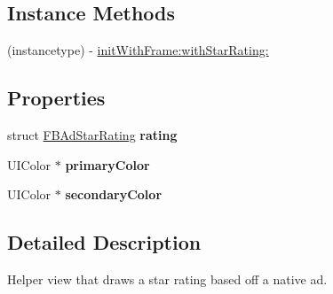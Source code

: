 \subsection*{Instance Methods}
\begin{DoxyCompactItemize}
\item 
(instancetype) -\/ \hyperlink{interface_f_b_ad_star_rating_view_a3f39ce2c6898e4ad58782983c757095e}{init\-With\-Frame\-:with\-Star\-Rating\-:}
\end{DoxyCompactItemize}
\subsection*{Properties}
\begin{DoxyCompactItemize}
\item 
\hypertarget{interface_f_b_ad_star_rating_view_ad4fe48e52d57b68092713ab2621f12e5}{struct \hyperlink{struct_f_b_ad_star_rating}{F\-B\-Ad\-Star\-Rating} {\bfseries rating}}\label{interface_f_b_ad_star_rating_view_ad4fe48e52d57b68092713ab2621f12e5}

\item 
\hypertarget{interface_f_b_ad_star_rating_view_abdccdf07181e9d4414a4bd5f04290f11}{U\-I\-Color $\ast$ {\bfseries primary\-Color}}\label{interface_f_b_ad_star_rating_view_abdccdf07181e9d4414a4bd5f04290f11}

\item 
\hypertarget{interface_f_b_ad_star_rating_view_aa4928b3e9d89a8e013c1a921fc300128}{U\-I\-Color $\ast$ {\bfseries secondary\-Color}}\label{interface_f_b_ad_star_rating_view_aa4928b3e9d89a8e013c1a921fc300128}

\end{DoxyCompactItemize}


\subsection{Detailed Description}
Helper view that draws a star rating based off a native ad. 

